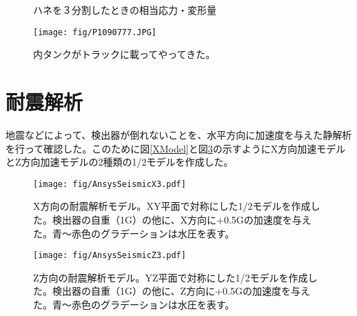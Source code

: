 \documentclass[11pt]{jreport}
\newcommand{\figref}[1]{図\ref{#1}}
\begin{document}
\begin{figure}[htbp]
  \begin{minipage}{0.47\textwidth}
  \end{minipage}
  \hfill
  \begin{minipage}{0.47\textwidth}
  \end{minipage}
    \caption{ハネを３分割したときの相当応力・変形量}
  \label{AnsysFVOverlap3}
\end{figure}


\begin{figure}[htbp]
\begin{center}
\texttt{[image: fig/P1090777.JPG]}
\caption[内タンク]{内タンクがトラックに載ってやってきた。}
\label{InstallInnerTank}
\end{center}
\end{figure}
\fi

\section{耐震解析}
地震などによって、検出器が倒れないことを、水平方向に加速度を与えた静解析を行って確認した。このために\figref{XModel}と\figref{ZModel}の示すようにX方向加速モデルとZ方向加速モデルの2種類の1/2モデルを作成した。


\begin{figure}[!h]
\begin{minipage}{0.47\textwidth}
\centering
\texttt{[image: fig/AnsysSeismicX3.pdf]}
\caption[耐震解析モデル：X方向]{X方向の耐震解析モデル。XY平面で対称にした1/2モデルを作成した。検出器の自重（1G）の他に、X方向に+0.5Gの加速度を与えた。青〜赤色のグラデーションは水圧を表す。}
\label{XModel}
\end{minipage}
\hfill
\begin{minipage}{0.47\textwidth}
\centering
\texttt{[image: fig/AnsysSeismicZ3.pdf]}
\caption[耐震解析モデル：Z方向]{Z方向の耐震解析モデル。YZ平面で対称にした1/2モデルを作成した。検出器の自重（1G）の他に、Z方向に+0.5Gの加速度を与えた。青〜赤色のグラデーションは水圧を表す。}
\label{ZModel}
\end{minipage}
\end{figure}
\end{document}
